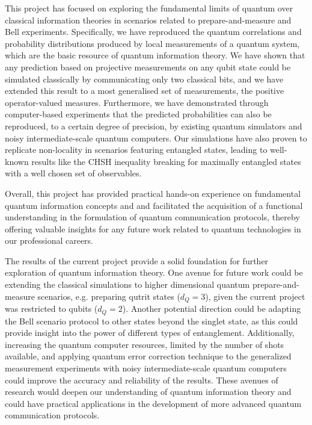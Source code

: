 This project has focused on exploring the fundamental limits of quantum over classical information theories in scenarios related to prepare-and-measure and Bell experiments. Specifically, we have reproduced the quantum correlations and probability distributions produced by local measurements of a quantum system, which are the basic resource of quantum information theory. We have shown that any prediction based on projective measurements on any qubit state could be simulated classically by communicating only two classical bits, and we have extended this result to a most generalised set of measurements, the positive operator-valued measures. Furthermore, we have demonstrated through computer-based experiments that the predicted probabilities can also be reproduced, to a certain degree of precision, by existing quantum simulators and noisy intermediate-scale quantum computers. Our simulations have also proven to replicate non-locality in scenarios featuring entangled states, leading to well-known results like the CHSH inequality breaking for maximally entangled states with a well chosen set of observables. 

Overall, this project has provided practical hands-on experience on fundamental quantum information concepts and and facilitated the acquisition of a functional understanding in the formulation of quantum communication protocols, thereby offering valuable insights for any future work related to quantum technologies in our professional careers.


The results of the current project provide a solid foundation for further exploration of quantum information theory. One avenue for future work could be extending the classical simulations to higher dimensional quantum prepare-and-measure scenarios, e.g. preparing qutrit states ($d_Q = 3$), given the current project was restricted to qubits ($d_Q = 2$). Another potential direction could be adapting the Bell scenario protocol to other states beyond the singlet state, as this could provide insight into the power of different types of entanglement. Additionally, increasing the quantum computer resources, limited by the number of shots available, and applying quantum error correction technique to the generalized measurement experiments with noisy intermediate-scale quantum computers could improve the accuracy and reliability of the results. These avenues of research would deepen our understanding of quantum information theory and could have practical applications in the development of more advanced quantum communication protocols.
